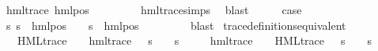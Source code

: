 \begin{isabellebody}
\ {\isachardoublequoteopen}hml{\isacharunderscore}{\kern0pt}trace\ {\isacharparenleft}{\kern0pt}hml{\isacharunderscore}{\kern0pt}pos\ {\isasymalpha}\ {\isasympsi}{\isacharparenright}{\kern0pt}{\isachardoublequoteclose}\ \isanewline
\ \ \ \ \isamarkupfalse%
\ hml{\isacharunderscore}{\kern0pt}trace{\isachardot}{\kern0pt}simps\ \isamarkupfalse%
\ blast\isanewline
\ \ \isamarkupfalse%
\ \isamarkupfalse%
\ {\isacharquery}{\kern0pt}case\ \isamarkupfalse%
\ {\isacartoucheopen}{\isacharparenleft}{\kern0pt}{\isasymforall}s{\isachardot}{\kern0pt}\ {\isacharparenleft}{\kern0pt}s\ {\isasymTurnstile}\ hml{\isacharunderscore}{\kern0pt}pos\ {\isasymalpha}\ {\isasymphi}{\isacharparenright}{\kern0pt}\ {\isacharequal}{\kern0pt}\ {\isacharparenleft}{\kern0pt}s\ {\isasymTurnstile}\ {\isacharparenleft}{\kern0pt}hml{\isacharunderscore}{\kern0pt}pos\ {\isasymalpha}\ {\isasympsi}{\isacharparenright}{\kern0pt}{\isacharparenright}{\kern0pt}{\isacharparenright}{\kern0pt}{\isacartoucheclose}\ \isanewline
\ \ \ \ \isamarkupfalse%
\ blast\isanewline
{}\isamarkupfalse%
%
\endisatagproof
{\isafoldproof}%
%
\isadelimproof
\isanewline
%
\endisadelimproof
\isanewline
{}\isamarkupfalse%
\ trace{\isacharunderscore}{\kern0pt}definitions{\isacharunderscore}{\kern0pt}equivalent{\isacharcolon}{\kern0pt}\ \isanewline
\ \ {\isachardoublequoteopen}{\isasymforall}{\isasymphi}{\isachardot}{\kern0pt}\ {\isacharparenleft}{\kern0pt}HML{\isacharunderscore}{\kern0pt}trace\ {\isasymphi}\ {\isasymlongrightarrow}\ {\isacharparenleft}{\kern0pt}{\isasymexists}{\isasympsi}{\isachardot}{\kern0pt}\ hml{\isacharunderscore}{\kern0pt}trace\ {\isasympsi}\ {\isasymand}\ {\isacharparenleft}{\kern0pt}s\ {\isasymTurnstile}\ {\isasympsi}\ {\isasymlongleftrightarrow}\ s\ {\isasymTurnstile}\ {\isasymphi}{\isacharparenright}{\kern0pt}{\isacharparenright}{\kern0pt}{\isacharparenright}{\kern0pt}{\isachardoublequoteclose}\isanewline
\ \ {\isachardoublequoteopen}{\isasymforall}{\isasymphi}{\isachardot}{\kern0pt}\ {\isacharparenleft}{\kern0pt}hml{\isacharunderscore}{\kern0pt}trace\ {\isasymphi}\ {\isasymlongrightarrow}\ {\isacharparenleft}{\kern0pt}{\isasymexists}{\isasympsi}{\isachardot}{\kern0pt}\ HML{\isacharunderscore}{\kern0pt}trace\ {\isasympsi}\ {\isasymand}\ {\isacharparenleft}{\kern0pt}s\ {\isasymTurnstile}\ {\isasympsi}\ {\isasymlongleftrightarrow}\ s\ {\isasymTurnstile}\ {\isasymphi}{\isacharparenright}{\kern0pt}{\isacharparenright}{\kern0pt}{\isacharparenright}{\kern0pt}{\isachardoublequoteclose}\isanewline

\end{isabellebody}
